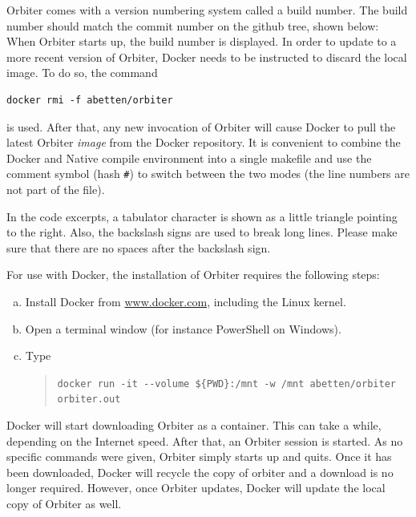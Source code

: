 \smallskip

Orbiter comes with a version numbering system called a build number. 
The build number should match the commit number on the github tree, shown below:
When Orbiter starts up, the build number is displayed.
In order to update to a more recent version of Orbiter, 
Docker needs to be instructed to discard the local image. 
To do so, the command 
\begin{verbatim}
docker rmi -f abetten/orbiter
\end{verbatim}	
is used.
After that, any new invocation of Orbiter 
will cause Docker to pull the latest Orbiter {\em image} from the 
Docker repository.
It is convenient to combine the Docker and Native compile environment into a single makefile 
and use the comment symbol (hash \verb'#') 
to switch between the two modes (the line numbers are not part of the file).




In the code excerpts, 
a tabulator character is shown as a little triangle pointing to the right. 
Also, the backslash signs are used to break long lines. 
Please make sure that there are no spaces after the backslash sign.



\bigskip



For use with Docker, the installation of Orbiter requires the following steps:
\begin{enumerate}[(a)]
\item
Install Docker from \url{www.docker.com}, including the Linux kernel.
\item
Open a terminal window (for instance PowerShell on Windows).
\item
Type
\begin{quote}
\verb'docker run -it --volume ${PWD}:/mnt -w /mnt abetten/orbiter orbiter.out'
\end{quote}
\end{enumerate}
Docker will start downloading Orbiter as a container. 
This can take a while, depending on the Internet speed.
After that, an Orbiter session is started. 
As no specific commands were given, Orbiter simply starts up and quits.
Once it has been downloaded, Docker will recycle the copy of orbiter and a download is no longer required.
However, once Orbiter updates, Docker will update the local copy of Orbiter as well.


